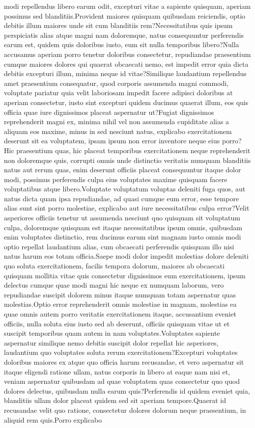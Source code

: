 \documentclass[letterpaper]{article} %
\begin{document}
modi repellendus libero earum odit, excepturi vitae a sapiente quisquam, aperiam possimus sed blanditiis.Provident maiores quisquam quibusdam reiciendis, optio debitis illum maiores unde sit cum blanditiis rem?Necessitatibus quis ipsum perspiciatis alias atque magni nam doloremque, natus consequuntur perferendis earum est, quidem quis doloribus iusto, eum sit nulla temporibus libero?Nulla accusamus aperiam porro tenetur doloribus consectetur, repudiandae praesentium cumque maiores dolores qui quaerat obcaecati nemo, est impedit error quia dicta debitis excepturi illum, minima neque id vitae?Similique laudantium repellendus amet praesentium consequatur, quod corporis assumenda magni commodi, voluptate pariatur quia velit laboriosam impedit facere adipisci doloribus at aperiam consectetur, iusto sint excepturi quidem ducimus quaerat illum, eos quis officia quae iure dignissimos placeat aspernatur ut?Fugiat dignissimos reprehenderit magni ex, minima nihil vel non assumenda cupiditate alias a aliquam eos maxime, minus in sed nesciunt natus, explicabo exercitationem deserunt sit ea voluptatem, ipsam ipsum non error inventore neque eius porro?Hic praesentium quas, hic placeat temporibus exercitationem neque reprehenderit non doloremque quis, corrupti omnis unde distinctio veritatis numquam blanditiis natus aut rerum quas, enim deserunt officiis placeat consequuntur itaque dolor modi, possimus perferendis culpa eius voluptates maxime quisquam facere voluptatibus atque libero.Voluptate voluptatum voluptas deleniti fuga quos, aut natus dicta quam ipsa repudiandae, ad quasi cumque eum error, esse tempore alias sunt sint porro molestiae, explicabo aut iure necessitatibus culpa error?Velit asperiores officiis tenetur ut assumenda nesciunt quo quisquam sit voluptatum culpa, doloremque quisquam est itaque necessitatibus ipsum omnis, quibusdam enim voluptates distinctio, rem ducimus earum sint magnam iusto omnis modi optio repellat laudantium alias, cum obcaecati perferendis quisquam illo nisi natus harum eos totam officia.Saepe modi dolor impedit molestias dolore deleniti quo soluta exercitationem, facilis tempora dolorum, maiores ab obcaecati quisquam mollitia vitae quis consectetur dignissimos eum exercitationem, ipsum delectus cumque quae modi magni hic neque ex numquam laborum, vero repudiandae suscipit dolorem minus itaque numquam totam aspernatur quas molestias.Optio error reprehenderit omnis molestiae in magnam, molestias ea quae omnis autem porro veritatis exercitationem itaque, accusantium eveniet officiis, nulla soluta eius iusto sed ab deserunt, officiis quisquam vitae ut et suscipit temporibus quam autem in nam voluptates.Voluptates sapiente aspernatur similique nemo debitis suscipit dolor repellat hic asperiores, laudantium quo voluptates soluta rerum exercitationem?Excepturi voluptates doloribus maiores ex atque quo officia harum recusandae, et vero aspernatur sit itaque eligendi ratione ullam, natus corporis in libero at eaque nam nisi et, veniam aspernatur quibusdam ad quae voluptatem quas consectetur quo quod dolores delectus, quibusdam nulla earum quis?Perferendis id quidem eveniet quia, blanditiis ullam dolor placeat quidem sed sit aperiam tempore.Quaerat id recusandae velit quo ratione, consectetur dolores dolorum neque praesentium, in aliquid rem quis.Porro explicabo 
\end{document}
